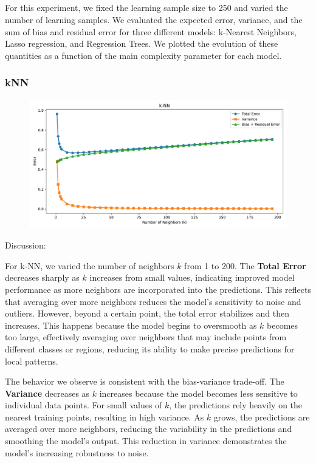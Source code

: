 \documentclass[a4paper,10pt]{article}
\begin{document}
\subsection{}

For this experiment, we fixed the learning sample size to 250 and varied the number of learning samples. We evaluated the expected error, variance, and the sum of bias and residual error for three different models: k-Nearest Neighbors, Lasso regression, and Regression Trees. We plotted the evolution of these quantities as a function of the main complexity parameter for each model.

\subsubsection{kNN}

\begin{figure}[H]
    \centering
    \includegraphics[width=0.8\linewidth]{images/2.3_knn.pdf}
\end{figure}

Discussion:

For k-NN, we varied the number of neighbors \(k\) from 1 to 200. The \textbf{Total Error} decreases sharply as \(k\) increases from small values, indicating improved model performance as more neighbors are incorporated into the predictions. This reflects that averaging over more neighbors reduces the model’s sensitivity to noise and outliers. However, beyond a certain point, the total error stabilizes and then increases. This happens because the model begins to oversmooth as \(k\) becomes too large, effectively averaging over neighbors that may include points from different classes or regions, reducing its ability to make precise predictions for local patterns.

The behavior we observe is consistent with the bias-variance trade-off.
The \textbf{Variance} decreases as \(k\) increases because the model becomes less sensitive to individual data points. For small values of \(k\), the predictions rely heavily on the nearest training points, resulting in high variance. As \(k\) grows, the predictions are averaged over more neighbors, reducing the variability in the predictions and smoothing the model's output. This reduction in variance demonstrates the model's increasing robustness to noise.
\end{document}
